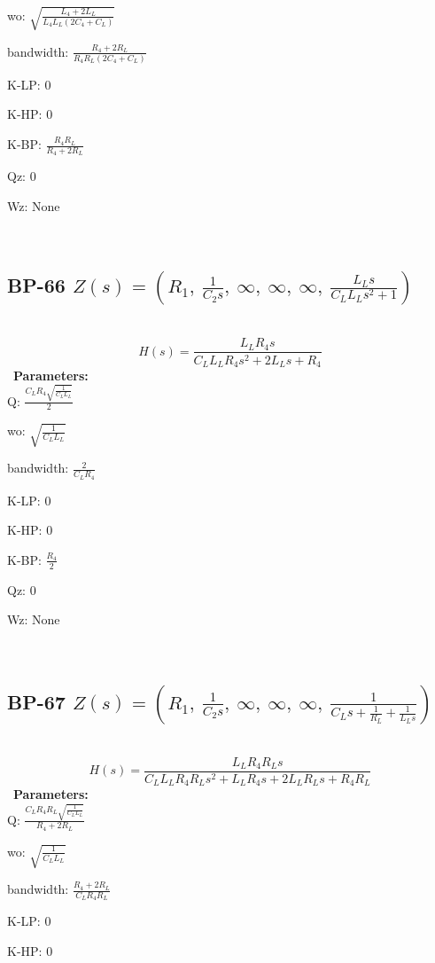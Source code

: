 \documentclass{article}
\begin{document}
wo: $\sqrt{\frac{L_{4} + 2 L_{L}}{L_{4} L_{L} \left(2 C_{4} + C_{L}\right)}}$\ 

bandwidth: $\frac{R_{4} + 2 R_{L}}{R_{4} R_{L} \left(2 C_{4} + C_{L}\right)}$\ 

K-LP: $0$\ 

K-HP: $0$\ 

K-BP: $\frac{R_{4} R_{L}}{R_{4} + 2 R_{L}}$\ 

Qz: $0$\ 

Wz: $\text{None}$\ 

\ 

\subsection{BP-66 $Z(s) = \left( R_{1}, \  \frac{1}{C_{2} s}, \  \infty, \  \infty, \  \infty, \  \frac{L_{L} s}{C_{L} L_{L} s^{2} + 1}\right)$ } \ 
\textbf{\[H(s) = \frac{L_{L} R_{4} s}{C_{L} L_{L} R_{4} s^{2} + 2 L_{L} s + R_{4}}\] } \ 
\textbf{Parameters:}\\ 

Q: $\frac{C_{L} R_{4} \sqrt{\frac{1}{C_{L} L_{L}}}}{2}$\ 

wo: $\sqrt{\frac{1}{C_{L} L_{L}}}$\ 

bandwidth: $\frac{2}{C_{L} R_{4}}$\ 

K-LP: $0$\ 

K-HP: $0$\ 

K-BP: $\frac{R_{4}}{2}$\ 

Qz: $0$\ 

Wz: $\text{None}$\ 

\ 

\subsection{BP-67 $Z(s) = \left( R_{1}, \  \frac{1}{C_{2} s}, \  \infty, \  \infty, \  \infty, \  \frac{1}{C_{L} s + \frac{1}{R_{L}} + \frac{1}{L_{L} s}}\right)$ } \ 
\textbf{\[H(s) = \frac{L_{L} R_{4} R_{L} s}{C_{L} L_{L} R_{4} R_{L} s^{2} + L_{L} R_{4} s + 2 L_{L} R_{L} s + R_{4} R_{L}}\] } \ 
\textbf{Parameters:}\\ 

Q: $\frac{C_{L} R_{4} R_{L} \sqrt{\frac{1}{C_{L} L_{L}}}}{R_{4} + 2 R_{L}}$\ 

wo: $\sqrt{\frac{1}{C_{L} L_{L}}}$\ 

bandwidth: $\frac{R_{4} + 2 R_{L}}{C_{L} R_{4} R_{L}}$\ 

K-LP: $0$\ 

K-HP: $0$\ 
\end{document}
